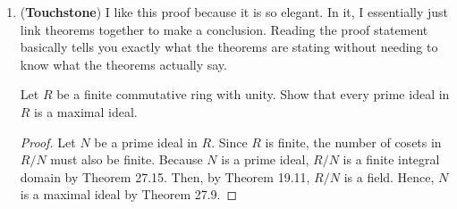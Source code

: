 \documentclass[12pt, oneside]{book}
\newcommand{\pf}[1]{
    \begin{customframedproof}[linecolor=horange!75]
        \begin{proof}
        #1
        \end{proof}
    \end{customframedproof}
}
\begin{document}
\begin{enumerate}[label=\textbf{\arabic*.}]
    \item (\textbf{Touchstone}) I like this proof because it is so elegant. In it, I essentially just link theorems together to make a conclusion. Reading the proof statement basically tells you exactly what the theorems are stating without needing to know what the theorems actually say. 

    Let \(R\) be a finite commutative ring with unity. Show that every prime ideal in \(R\) is a maximal ideal.
	\pf{
		Let \(N\) be a prime ideal in \(R\). Since \(R\) is finite, the number of cosets in \(R/N\) must also be finite. Because \(N\) is a prime ideal, \(R/N\) is a finite integral domain by Theorem 27.15. Then, by Theorem 19.11, \(R/N\) is a field. Hence, \(N\) is a maximal ideal by Theorem 27.9.  
	}
\end{enumerate}
\end{document}

